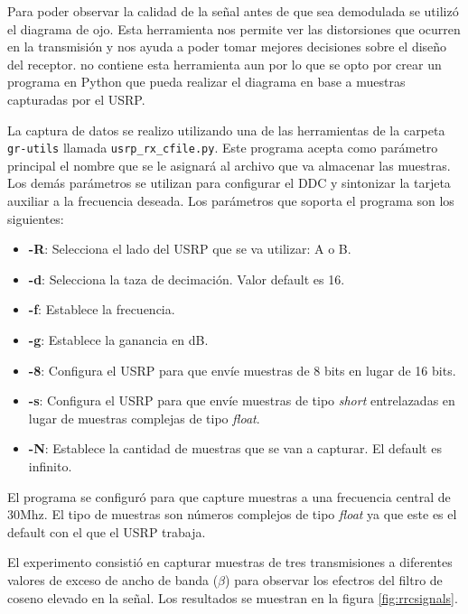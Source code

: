 Para poder observar la calidad de la se\~nal antes de que sea demodulada se utiliz\'o el diagrama de
ojo. Esta herramienta nos permite ver las distorsiones que ocurren en la transmisi\'on y nos ayuda a
poder tomar mejores decisiones sobre el dise\~no del receptor. \gnuradio no contiene esta
herramienta aun por lo que se opto por crear un programa en Python que pueda realizar el diagrama en
base a muestras capturadas por el USRP.

La captura de datos se realizo utilizando una de las herramientas de la carpeta \verb|gr-utils|
llamada \verb|usrp_rx_cfile.py|. Este programa acepta como par\'ametro principal el nombre que se le
asignar\'a al archivo que va almacenar las muestras. Los dem\'as par\'ametros se utilizan para
configurar el DDC y sintonizar la tarjeta auxiliar a la frecuencia deseada. Los par\'ametros que
soporta el programa son los siguientes:

\begin{itemize}
  \item \textbf{-R}: Selecciona el lado del USRP que se va utilizar: A o B.
  \item \textbf{-d}: Selecciona la taza de decimaci\'on. Valor default es 16.
  \item \textbf{-f}: Establece la frecuencia.
  \item \textbf{-g}: Establece la ganancia en dB.
  \item \textbf{-8}: Configura el USRP para que env\'ie muestras de 8 bits en lugar de 16 bits.
  \item \textbf{-s}: Configura el USRP para que env\'ie muestras de tipo \emph{short} entrelazadas
  en lugar de muestras complejas de tipo \emph{float}.
  \item \textbf{-N}: Establece la cantidad de muestras que se van a capturar. El default es
  infinito.
\end{itemize}

El programa se configur\'o para que capture muestras a una frecuencia central de 30Mhz. El tipo de
muestras son n\'umeros complejos de tipo \emph{float} ya que este es el default con el que el USRP
trabaja.

El experimento consisti\'o en capturar muestras de tres transmisiones a diferentes valores de exceso
de ancho de banda ($\beta$) para observar los efectros del filtro de coseno elevado en la se\~nal.
Los resultados se muestran en la figura \ref{fig:rrcsignals}.

